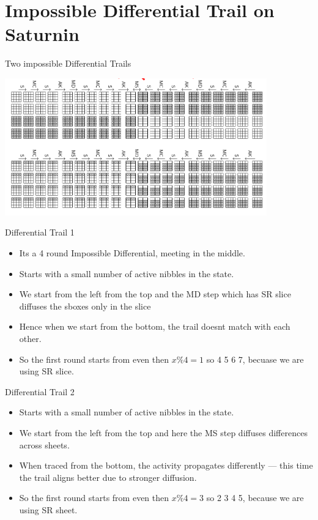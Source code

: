\section{Impossible Differential Trail on Saturnin}
\begin{frame}{Two impossible Differential Trails}
    \begin{center}
        \includegraphics[width=0.85\textwidth,height=0.9\textheight,keepaspectratio]{Images/Figures/imp_diff.png}
    \end{center}
\end{frame}

\begin{frame}{Differential Trail 1}
    \begin{itemize}
        \item Its a 4 round Impossible Differential, meeting in the middle.
        \item Starts with a small number of active nibbles in the state.
        \item We start from the left from the top and the MD step which has SR slice diffuses the sboxes only in the slice
        \item Hence when we start from the bottom, the trail doesnt match with each other.
        \item So the first round starts from even then $x\%4 = 1$ so 4 5 6 7, becuase we are using SR slice.
        \end{itemize}
    \end{frame}
    
    \begin{frame}{Differential Trail 2}
        \begin{itemize}
            \item Starts with a small number of active nibbles in the state.
            \item We start from the left from the top and here the MS step diffuses differences across sheets.
            \item When traced from the bottom, the activity propagates differently — this time the trail aligns better due to stronger diffusion.
            \item So the first round starts from even then $x\%4 = 3$ so 2 3 4 5, because we are using SR sheet.
        \end{itemize}
    \end{frame}
    
    